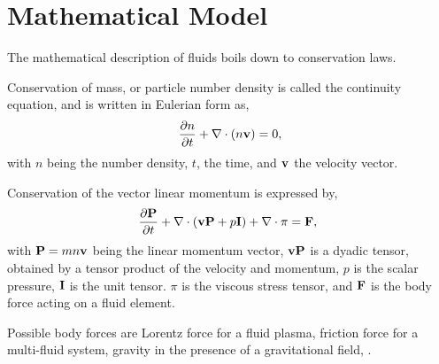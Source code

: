 \section{Mathematical Model}

The mathematical description of fluids boils down to conservation laws. 

Conservation of mass, or particle number density is called the continuity equation, and is written in Eulerian form as,
\begin{gather}
	\frac{\partial n}{\partial t} + \nabla \cdot (n \mathbf{v}) = 0,
\end{gather}
with $n$ being the number density, $t$, the time, and $\mathbf{v}$ the velocity vector.

Conservation of the vector linear momentum is expressed by,
\begin{gather}
    \frac{\partial \mathbf{P}}{\partial t} + \nabla \cdot\left(\mathbf{v} \mathbf{P} + p \mathbf{I} \right) +\nabla \cdot \pi  =  \mathbf{F},~\label{eq:momentum}
\end{gather}
with $\mathbf{P} = m n \mathbf{v}$ being the linear momentum vector, $\mathbf{v} \mathbf{P}$ is a dyadic tensor, obtained by a tensor product of the velocity and momentum, $p$ is the scalar pressure, $\mathbf{I}$ is the unit tensor. $\pi$ is the viscous stress tensor, and $\mathbf{F}$ is the body force acting on a fluid element.

Possible body forces are Lorentz force for a fluid plasma, friction force for a multi-fluid system, gravity in the presence of a gravitational field, .